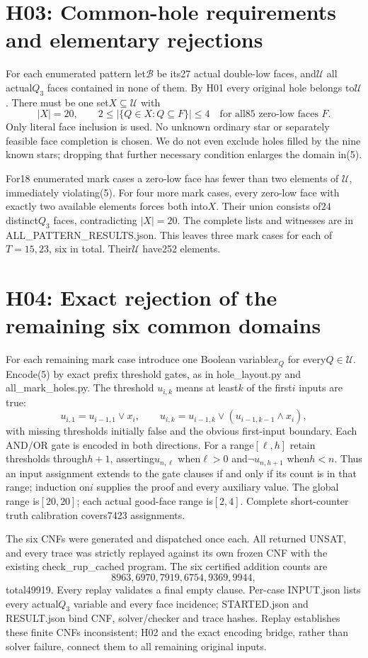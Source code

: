\documentclass{article}
\begin{document}
\section{H03: Common-hole requirements and elementary rejections}
For each enumerated pattern let$\mathcal B$ be its27 actual double-low
faces, and$\mathcal U$ all actual$Q_3$ faces contained in none of them.
By H01 every original hole belongs to$\mathcal U$. There must be one
set$X\subseteq\mathcal U$ with
\[
  |X|=20,\qquad 2\le|\{Q\in X:Q\subseteq F\}|\le4
                \quad\text{for all85 zero-low faces }F.    \tag{5}
\]
Only literal face inclusion is used. No unknown ordinary star or
separately feasible face completion is chosen. We do not even exclude
holes filled by the nine known stars; dropping that further necessary
condition enlarges the domain in(5).

For18 enumerated mark cases a zero-low face has fewer than two elements of
$\mathcal U$, immediately violating(5). For four more mark cases,
every zero-low face with exactly two available elements forces both
into$X$. Their union consists of24 distinct$Q_3$ faces, contradicting
$|X|=20$. The complete lists and witnesses are in
ALL\_PATTERN\_RESULTS.json. This leaves three mark cases for each of
$T=15,23$, six in total. Their$\mathcal U$ have252 elements.

\section{H04: Exact rejection of the remaining six common domains}
For each remaining mark case introduce one Boolean variable$x_Q$ for
every$Q\in\mathcal U$. Encode(5) by exact prefix threshold gates,
as in hole\_layout.py and all\_mark\_holes.py. The threshold
$u_{i,k}$ means at least$k$ of the first$i$ inputs are true:
\[
 u_{i,1}=u_{i-1,1}\lor x_i,\qquad
 u_{i,k}=u_{i-1,k}\lor(u_{i-1,k-1}\land x_i),
\]
with missing thresholds initially false and the obvious first-input
boundary. Each AND/OR gate is encoded in both directions. For a
range$[\ell,h]$ retain thresholds through$h+1$, asserting$u_{n,\ell}$
when$\ell>0$ and$\neg u_{n,h+1}$ when$h<n$. Thus an input assignment
extends to the gate clauses if and only if its count is in that range;
induction on$i$ supplies the proof and every auxiliary value.
The global range is$[20,20]$; each actual good-face range is$[2,4]$.
Complete short-counter truth calibration covers7423 assignments.

The six CNFs were generated and dispatched once each. All returned
UNSAT, and every trace was strictly replayed against its own frozen
CNF with the existing check\_rup\_cached program. The six certified
addition counts are
\[
                   8963,6970,7919,6754,9369,9944,
\]
total49919. Every replay validates a final empty clause. Per-case
INPUT.json lists every actual$Q_3$ variable and every face incidence;
STARTED.json and RESULT.json bind CNF, solver/checker and trace hashes.
Replay establishes these finite CNFs inconsistent; H02 and the exact
encoding bridge, rather than solver failure, connect them to all
remaining original inputs.
\end{document}
